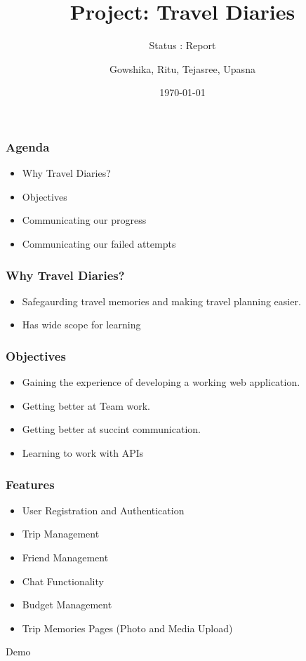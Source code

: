 \documentclass{beamer}
\title{Project: Travel Diaries}
\subtitle{Status : Report}
\author{Gowshika, Ritu, Tejasree, Upasna}
\date{\today}
\begin{document}
\frame{\titlepage}

\begin{frame}
    \frametitle{Agenda}
    \begin{itemize}
      \item Why Travel Diaries?
      \item Objectives
      \item Communicating our progress
      \item Communicating our failed attempts
    \end{itemize}
    \end{frame}

\begin{frame}
    \frametitle{Why Travel Diaries?}
    \begin{itemize}
        \item Safegaurding travel memories and making travel planning easier.
        \item Has wide scope for learning
    \end{itemize}
\end{frame}

\begin{frame}
  \frametitle{Objectives}
  \begin{itemize}
    \item Gaining the experience of developing a working web application.
    \item Getting better at Team work.
    \item Getting better at succint communication.
    \item Learning to work with APIs
  \end{itemize}
\end{frame}

\begin{frame}
  \frametitle{Features}
  \begin{itemize}
    \item User Registration and Authentication
    \item Trip Management
    \item Friend Management
    \item Chat Functionality
    \item Budget Management
    \item Trip Memories Pages (Photo and Media Upload)
  \end{itemize}
\end{frame}

\begin{frame}
    \center\Huge Demo
\end{frame}
\end{document}
